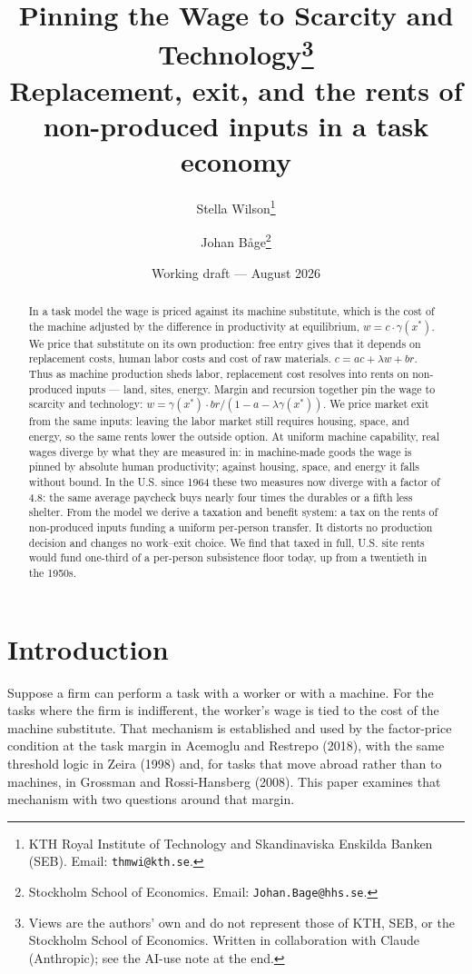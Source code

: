 \documentclass[12pt]{article}
\title{\bfseries Pinning the Wage to Scarcity and Technology\thanks{Views are the
  authors' own and do not represent those of KTH, SEB, or the Stockholm School of
  Economics. Written in collaboration with Claude (Anthropic); see the AI-use note
  at the end.
  }\\[7pt]
  \large\mdseries Replacement, exit, and the rents of non-produced inputs in a task economy}
\author{Stella Wilson\thanks{KTH Royal Institute of Technology and Skandinaviska
    Enskilda Banken (SEB). Email: \texttt{thmwi@kth.se}.}
  \and
  Johan B\r{a}ge\thanks{Stockholm School of Economics.
    Email: \texttt{Johan.Bage@hhs.se}.
  }}
\date{Working draft --- August 2026}
\theoremstyle{plain}
\begin{document}
\maketitle

\begin{abstract}
\noindent In a task model the wage is priced against its machine substitute, which is the cost of the machine adjusted by the difference in productivity at equilibrium, $w = c\cdot \gamma (x^*)$. We price that substitute on its own production: free entry gives that it depends on replacement costs, human labor costs and cost of raw materials. $c = ac + \lambda w + br$. Thus as machine production sheds labor, replacement cost resolves into rents on non-produced inputs --- land, sites, energy. Margin and recursion together pin the wage to scarcity and technology: $w = \gamma (x^*)\cdot br/(1 - a - \lambda \gamma (x^*))$. We price market exit from the same inputs: leaving the labor market still requires housing, space, and energy, so the same rents lower the outside option. At uniform machine capability, real wages diverge by what they are measured in: in machine-made goods the wage is pinned by absolute human productivity; against housing, space, and energy it falls without bound. In the U.S. since 1964 these two measures now diverge with a factor of 4.8: the same average paycheck buys nearly four times the durables or a fifth less shelter. From the model we derive a taxation and benefit system: a tax on the rents of non-produced inputs funding a uniform per-person transfer. It distorts no production decision and changes no work--exit choice. We find that taxed in full, U.S. site rents would fund one-third of a per-person subsistence floor today, up from a twentieth in the 1950s.
\end{abstract}

\section{Introduction}\label{sec:intro}

Suppose a firm can perform a task with a worker or with a machine. For the tasks where the firm is indifferent, the worker's wage is tied to the cost of the machine substitute. That mechanism is established and used by the factor-price condition at the task margin in Acemoglu and Restrepo (2018), with the same threshold logic in Zeira (1998) and, for tasks that move abroad rather than to machines, in Grossman and Rossi-Hansberg (2008). This paper examines that mechanism with two questions around that margin.
\end{document}

